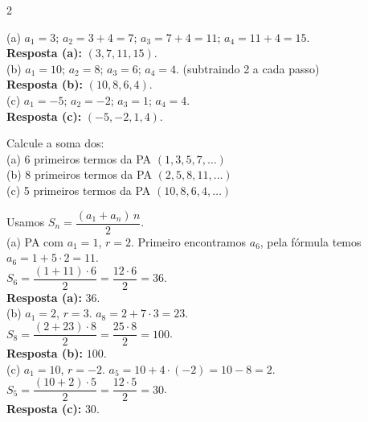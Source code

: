 \documentclass[11pt]{article}
\begin{document}
\begin{multicols}{2}
\begin{tcolorbox}[colback=green!10,colframe=green!60!black, title=\textbf{Solução da questão 4 }, text width=0.9\columnwidth]
(a) $a_1=3$; $a_2=3+4=7$; $a_3=7+4=11$; $a_4=11+4=15$. \\
\textbf{Resposta (a):} $(3,7,11,15)$. \\

(b) $a_1=10$; $a_2=8$; $a_3=6$; $a_4=4$. (subtraindo 2 a cada passo) \\
\textbf{Resposta (b):} $(10,8,6,4)$. \\

(c) $a_1=-5$; $a_2=-2$; $a_3=1$; $a_4=4$. \\
\textbf{Resposta (c):} $(-5,-2,1,4)$. \\
\end{tcolorbox}

\begin{tcolorbox}[colback=blue!8,colframe=blue!60!black, title=\textbf{Questão 5 }, text width=0.9\columnwidth]
Calcule a soma dos: \\
(a) 6 primeiros termos da PA $(1,3,5,7,\ldots)$ \\
(b) 8 primeiros termos da PA $(2,5,8,11,\ldots)$ \\
(c) 5 primeiros termos da PA $(10,8,6,4,\ldots)$
\end{tcolorbox}

\begin{tcolorbox}[colback=green!10,colframe=green!60!black, title=\textbf{Solução da questão 5 }, text width=0.9\columnwidth]

Usamos $S_n = \dfrac{(a_1 + a_n)\, n}{2}$. \\

    (a) PA com $a_1=1$, $r=2$. Primeiro encontramos $a_6$, pela fórmula temos $\boxed{a_6 = 1 + 5\cdot2 = 11}$. \\

$S_6 = \dfrac{(1+11)\cdot 6}{2} = \dfrac{12\cdot6}{2}=36$. \\
\textbf{Resposta (a):} $36$. \\

(b) $a_1=2$, $r=3$. $a_8 = 2 + 7\cdot3 = 23$. \\
$S_8 = \dfrac{(2+23)\cdot8}{2} = \dfrac{25\cdot8}{2}=100$. \\
\textbf{Resposta (b):} $100$. \\

(c) $a_1=10$, $r=-2$. $a_5 = 10 + 4\cdot(-2) = 10 -8 = 2$. \\
$S_5 = \dfrac{(10+2)\cdot5}{2} = \dfrac{12\cdot5}{2} = 30$. \\
\textbf{Resposta (c):} $30$.
\end{tcolorbox}


\end{multicols}
\end{document}
